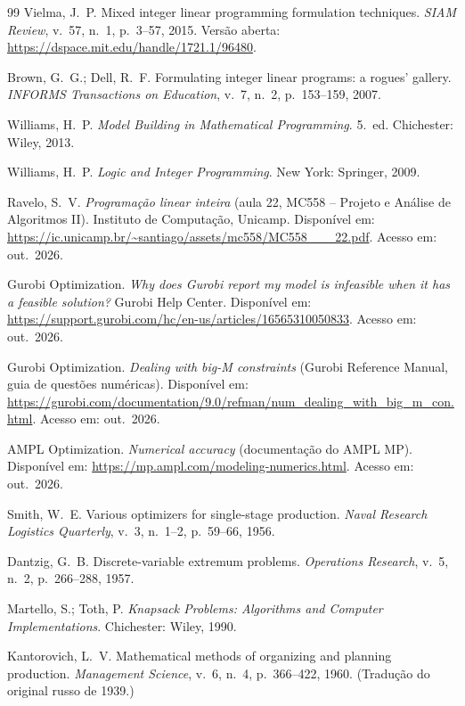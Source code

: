 \begin{thebibliography}{99}
Vielma, J.~P. Mixed integer linear programming formulation techniques. \emph{SIAM Review}, v.~57, n.~1, p.~3--57,
2015. Versão aberta: \url{https://dspace.mit.edu/handle/1721.1/96480}.

Brown, G.~G.; Dell, R.~F. Formulating integer linear programs: a rogues' gallery. \emph{INFORMS Transactions on
Education}, v.~7, n.~2, p.~153--159, 2007.

Williams, H.~P. \emph{Model Building in Mathematical Programming}. 5.~ed. Chichester: Wiley, 2013.

Williams, H.~P. \emph{Logic and Integer Programming}. New York: Springer, 2009.

Ravelo, S.~V. \emph{Programação linear inteira} (aula 22, MC558 -- Projeto e Análise de Algoritmos II). Instituto de
Computação, Unicamp. Disponível em: \url{https://ic.unicamp.br/~santiago/assets/mc558/MC558___22.pdf}. Acesso em:
out.\ 2026.

Gurobi Optimization. \emph{Why does Gurobi report my model is infeasible when it has a feasible solution?} Gurobi
Help Center. Disponível em: \url{https://support.gurobi.com/hc/en-us/articles/16565310050833}. Acesso em: out.\ 2026.

Gurobi Optimization. \emph{Dealing with big-M constraints} (Gurobi Reference Manual, guia de questões numéricas).
Disponível em: \url{https://gurobi.com/documentation/9.0/refman/num_dealing_with_big_m_con.html}. Acesso em: out.\ 2026.

AMPL Optimization. \emph{Numerical accuracy} (documentação do AMPL MP). Disponível em:
\url{https://mp.ampl.com/modeling-numerics.html}. Acesso em: out.\ 2026.

Smith, W.~E. Various optimizers for single-stage production. \emph{Naval Research Logistics Quarterly}, v.~3,
n.~1--2, p.~59--66, 1956.

Dantzig, G.~B. Discrete-variable extremum problems. \emph{Operations Research}, v.~5, n.~2, p.~266--288, 1957.

Martello, S.; Toth, P. \emph{Knapsack Problems: Algorithms and Computer Implementations}. Chichester: Wiley, 1990.

Kantorovich, L.~V. Mathematical methods of organizing and planning production. \emph{Management Science}, v.~6,
n.~4, p.~366--422, 1960. (Tradução do original russo de 1939.)


\end{thebibliography}
